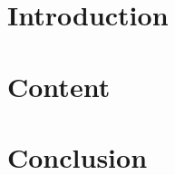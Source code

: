 \documentclass[oneside]{article}
\begin{document}
\Coverpage
\section{Introduction}\blindtext[1]\newpage
\section{Content}\blindmathpaper
\section{Conclusion}\blindtext[1]
\Affirmation
\end{document}
